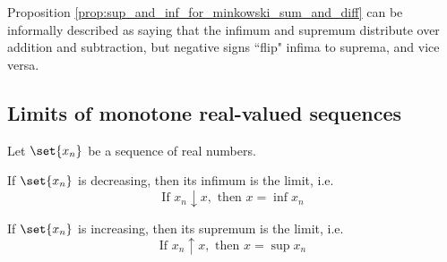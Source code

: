 \documentclass{article} %
\begin{document}
\begin{remark}
Proposition \ref{prop:sup_and_inf_for_minkowski_sum_and_diff} can be informally described as saying that the infimum and supremum distribute over addition and subtraction, but negative signs ``flip" infima to suprema, and vice versa. 
\end{remark}



\subsection{Limits of monotone real-valued sequences}

\begin{proposition}
Let $\set{x_n}$ be a sequence of real numbers.  
\begin{alphabate}
\item If $\set{x_n}$ is decreasing, then its infimum is the limit, i.e.
\[ \text{If } x_n \downarrow x, \text{ then } x = \inf x_n \]
\item If $\set{x_n}$ is increasing, then its supremum is the limit, i.e. 
\[ \text{If } x_n \uparrow x, \text{ then } x = \sup x_n \] 	
\end{alphabate}
\label{prop:limit_of_monotone_sequences_as_inf_and_sup}
\end{proposition}
\end{document}
